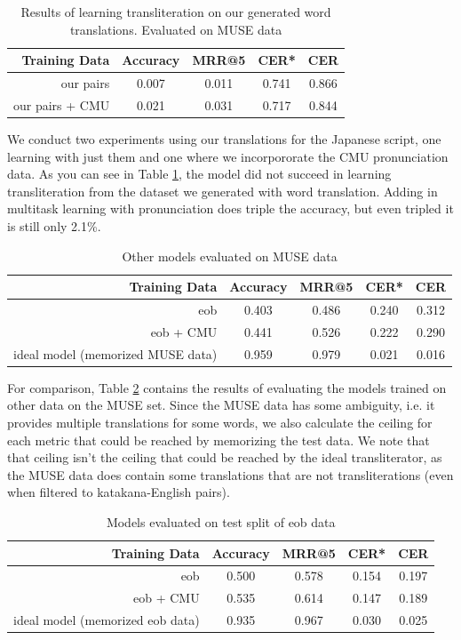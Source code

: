 \documentclass{article}
\begin{document}
\begin{table}[h]
  \centering
  \begin{tabular}{r | c c c c}
    \toprule
    Training Data & Accuracy & MRR@5 & CER* & CER \\
    \midrule
    our pairs & 0.007 & 0.011 & 0.741 & 0.866 \\
    our pairs + CMU & 0.021 & 0.031 & 0.717 & 0.844 \\
    \bottomrule
  \end{tabular}
  \caption{Results of learning transliteration on our generated word
    translations. Evaluated on MUSE data}
  \label{tab:our-muse}
\end{table}

We conduct two experiments using our translations for the Japanese script,
one learning with just them
and one where we incorpororate the CMU pronunciation data.
As you can see in Table \ref{tab:our-muse},
the model did not succeed in learning transliteration
from the dataset we generated with word translation.
Adding in multitask learning with pronunciation does triple the accuracy,
but even tripled it is still only 2.1\%.

\begin{table}[h]
  \centering
  \begin{tabular}{r | c c c c}
    \toprule
    Training Data & Accuracy & MRR@5 & CER* & CER \\
    \midrule
    eob & 0.403 & 0.486 & 0.240 & 0.312 \\
    eob + CMU & 0.441 & 0.526 & 0.222 & 0.290 \\
    \midrule
    ideal model (memorized MUSE data) & 0.959 & 0.979 & 0.021 & 0.016\\
    \bottomrule
  \end{tabular}
  \caption{Other models evaluated on MUSE data}
  \label{tab:other-muse}
\end{table}

For comparison,
Table \ref{tab:other-muse} contains the results of evaluating
the models trained on other data on the MUSE set.
Since the MUSE data has some ambiguity,
i.e. it provides multiple translations for some words,
we also calculate the ceiling for each metric
that could be reached by memorizing the test data.
We note that that ceiling isn't
the ceiling that could be reached by the ideal transliterator,
as the MUSE data does contain some translations that are not transliterations
(even when filtered to katakana-English pairs).

\begin{table}[h]
  \centering
  \begin{tabular}{r | c c c c}
    \toprule
    Training Data & Accuracy & MRR@5 & CER* & CER \\
    \midrule
    eob & 0.500 & 0.578 & 0.154 & 0.197 \\
    eob + CMU & 0.535 & 0.614 & 0.147 & 0.189 \\
    \midrule
    ideal model (memorized eob data) & 0.935 & 0.967 & 0.030 & 0.025 \\
    \bottomrule
  \end{tabular}
  \caption{Models evaluated on test split of eob data}
  \label{tab:eob-results}
\end{table}
\end{document}
